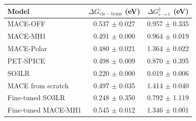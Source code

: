 \begin{tabular}{lcc}
\hline
Model & $\Delta G_{\mathrm{cis-trans}}$ (eV) & $\Delta G^\ddagger_{\mathrm{c\to t}}$ (eV) \\
\hline
MACE-OFF & 0.537 $\pm$ 0.027 & 0.957 $\pm$ 0.335 \\
MACE-MH1 & 0.491 $\pm$ 0.000 & 0.964 $\pm$ 0.019 \\
MACE-Polar & 0.480 $\pm$ 0.021 & 1.364 $\pm$ 0.022 \\
PET-SPICE & 0.498 $\pm$ 0.009 & 0.870 $\pm$ 0.395 \\
SO3LR & 0.220 $\pm$ 0.000 & 0.019 $\pm$ 0.006 \\
MACE from scratch & 0.497 $\pm$ 0.035 & 1.414 $\pm$ 0.040 \\
Fine-tuned SO3LR & 0.248 $\pm$ 0.350 & 0.792 $\pm$ 1.119 \\
Fine-tuned MACE-MH1 & 0.545 $\pm$ 0.012 & 1.346 $\pm$ 0.001 \\
\hline
\end{tabular}
